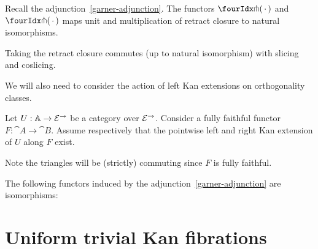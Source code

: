 \documentclass[reqno,10pt,a4paper,oneside]{amsart}
\begin{document}
\begin{lemma}
\label{retract-closure}
Recall the adjunction~\eqref{garner-adjunction}.
The functors $\liftr{\brarghole}$ and $\liftl{\brarghole}$ maps unit and multiplication of retract closure to natural isomorphisms.
\end{lemma}

\begin{remark}
\label{retract-closure-slicing}
Taking the retract closure commutes (up to natural isomorphism) with slicing and coslicing.
\end{remark}

\medskip

We will also need to consider the action of left Kan extensions on orthogonality classes.

Let $U : \mathbb{A} \to \mathcal{E}^{\to}$ be a category over $\mathcal{E}^{\to}$.
Consider a fully faithful functor $F : \cat{A} \to \cat{B}$.
Assume respectively that the pointwise left and right Kan extension of $U$ along $F$ exist.
Note the triangles will be (strictly) commuting since $F$ is fully faithful.

\begin{lemma}
\label{kan-extension-closure}
The following functors induced by the adjunction~\eqref{garner-adjunction} are isomorphisms:
\end{lemma}





\section{Uniform trivial Kan fibrations} 
\end{document}
